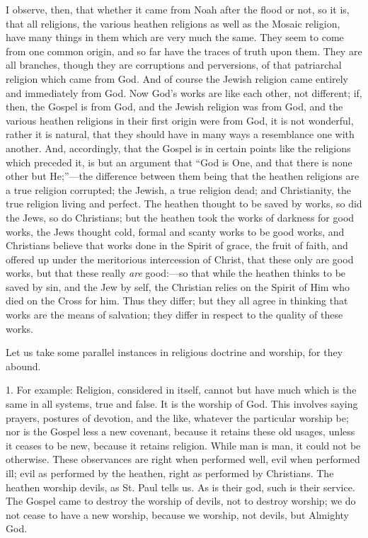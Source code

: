I observe, then, that whether it came from Noah after the flood or
not, so it is, that all religions, the various heathen religions as
well as the Mosaic religion, have many things in them which are very
much the same. They seem to come from one common origin, and so far
have the traces of truth upon them. They are all branches, though they
are corruptions and perversions, of that patriarchal religion which
came from God. And of course the Jewish religion came entirely and
immediately from God. Now God's works are like each other, not
different; if, then, the Gospel is from God, and the Jewish religion
was from God, and the various heathen religions in their first origin
were from God, it is not wonderful, rather it is natural, that they
should have in many ways a resemblance one with another. And,
accordingly, that the Gospel is in certain points like the religions
which preceded it, is but an argument that ``God is One, and that
there is none other but He;''—the difference between them being
that the heathen religions are a true religion corrupted; the Jewish,
a true religion dead; and Christianity, the true religion living and
perfect. The heathen thought to be saved by works, so did the Jews, so
do Christians; but the heathen took the works of darkness for good
works, the Jews thought cold, formal and scanty works to be good
works, and Christians believe that works done in the Spirit of grace,
the fruit of faith, and offered up under the meritorious intercession
of Christ, that these only are good works, but that these really \emph{are}
good:—so that while the heathen thinks to be saved by sin, and the
Jew by self, the Christian relies on the Spirit of Him who died on the
Cross for him. Thus they differ; but they all agree in thinking that
works are the means of salvation; they differ in respect to the
quality of these works.

Let us take some parallel instances in religious doctrine and
worship, for they abound.

1. For example: Religion, considered in itself, cannot but have
much which is the same in all systems, true and false. It is the
worship of God. This involves saying prayers, postures of devotion,
and the like, whatever the particular worship be; nor is the Gospel
less a new covenant, because it retains these old usages, unless it
ceases to be new, because it retains religion. While man is man, it
could not be otherwise. These observances are right when performed
well, evil when performed ill; evil as performed by the heathen, right
as performed by Christians. The heathen worship devils, as St. Paul
tells us. As is their god, such is their service. The Gospel came to
destroy the worship of devils, not to destroy worship; we do not cease
to have a new worship, because we worship, not devils, but Almighty
God.

